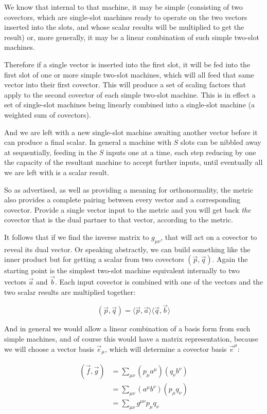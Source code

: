We know that internal to that machine, it may be simple (consisting of two covectors, which are single-slot machines ready to operate on the two vectors inserted into the slots, and whose scalar results will be multiplied to get the result) or, more generally, it may be a linear combination of such simple two-slot machines.

Therefore if a single vector is inserted into the first slot, it will be fed into the first slot of one or more simple two-slot machines, which will all feed that same vector into their first covector. This will produce a set of scaling factors that apply to the second covector of each simple two-slot machine. This is in effect a set of single-slot machines being linearly combined into a single-slot machine (a weighted sum of covectors).

And we are left with a new single-slot machine awaiting another vector before it can produce a final scalar. In general a machine with $S$ slots can be nibbled away at sequentially, feeding in the $S$ inputs one at a time, each step reducing by one the capacity of the resultant machine to accept further inputs, until eventually all we are left with is a scalar result.

So as advertised, as well as providing a meaning for orthonormality, the metric also provides a complete pairing between every vector and a corresponding covector. Provide a single vector input to the metric and you will get back \textit{the} covector that is the dual partner to that vector, according to the metric.

It follows that if we find the inverse matrix to $g_{\mu\nu}$, that will act on a covector to reveal its dual vector. Or speaking abstractly, we can build something like the inner product but for getting a scalar from two covectors $(\vec{p}, \vec{q})$. Again the starting point is the simplest two-slot machine equivalent internally to two vectors $\vec{a}$ and $\vec{b}$. Each input covector is combined with one of the vectors and the two scalar results are multiplied together:

$$
(\vec{p}, \vec{q}) =
\langle \vec{p}, \vec{a} \rangle
\langle \vec{q}, \vec{b} \rangle
$$

And in general we would allow a linear combination of a basis form from such simple machines, and of course this would have a matrix representation, because we will choose a vector basis $\vec{e}_{\mu}$, which will determine a covector basis $\vec{e}^{\mu}$:

\begin{equation}
\begin{split}
(\vec{f},\vec{g}) 
    &= \sum_{\mu\nu} \left( p_{\mu} a^{\mu} \right) 
                     \left( q_{\nu} b^{\nu} \right) \\
    &= \sum_{\mu\nu} \left( a^{\mu} b^{\nu} \right) 
                     \left( p_{\mu} q_{\nu} \right) \\
    &= \sum_{\mu\nu} g^{\mu\nu} p_{\mu} q_{\nu} 
\end{split}
\end{equation}


